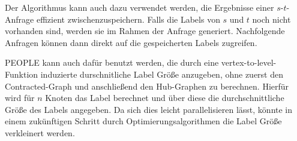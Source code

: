 Der Algorithmus kann auch dazu verwendet werden, die Ergebnisse einer $s$-$t$-Anfrage effizient zwischenzuspeichern.
Falls die Labels von $s$ und $t$ noch nicht vorhanden sind, werden sie im Rahmen der Anfrage generiert.
Nachfolgende Anfragen können dann direkt auf die gespeicherten Labels zugreifen.

PEOPLE kann auch dafür benutzt werden, die durch eine vertex-to-level-Funktion induzierte durschnitliche Label Größe anzugeben, ohne zuerst den Contracted-Graph und anschließend den Hub-Graphen zu berechnen.
Hierfür wird für $n$ Knoten das Label berechnet und über diese die durchschnittliche Größe des Labels angegeben.
Da sich dies leicht parallelisieren lässt, könnte in einem zukünftigen Schritt durch Optimierungsalgorithmen die Label Größe verkleinert werden.